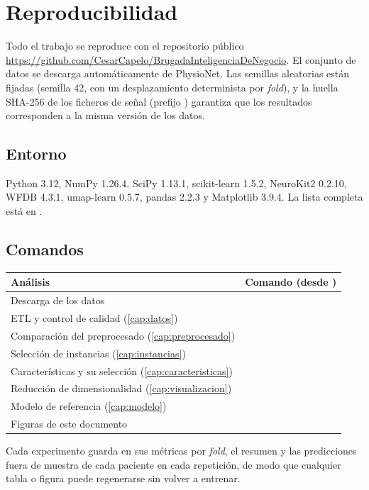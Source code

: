 \clearpage
\section{Reproducibilidad}\label{ap:reproducibilidad}

Todo el trabajo se reproduce con el repositorio público \url{https://github.com/CesarCapelo/BrugadaInteligenciaDeNegocio}. El conjunto de datos se descarga automáticamente de PhysioNet. Las semillas aleatorias están fijadas (semilla 42, con un desplazamiento determinista por \emph{fold}), y la huella SHA-256 de los ficheros de señal (prefijo ) garantiza que los resultados corresponden a la misma versión de los datos.

\subsection*{Entorno}

Python 3.12, NumPy 1.26.4, SciPy 1.13.1, scikit-learn 1.5.2, NeuroKit2 0.2.10, WFDB 4.3.1, umap-learn 0.5.7, pandas 2.2.3 y Matplotlib 3.9.4. La lista completa está en .

\subsection*{Comandos}

\begin{center}
\small
\begin{tabularx}{\linewidth}{@{}p{4.3cm}L@{}}
\toprule
\textbf{Análisis} & \textbf{Comando (desde )} \\
\midrule
Descarga de los datos &  \\
ETL y control de calidad (\cref{cap:datos}) &  \\
Comparación del preprocesado (\cref{cap:preprocesado}) &  \\
Selección de instancias (\cref{cap:instancias}) &  \\
Características y su selección (\cref{cap:caracteristicas}) &  \\
Reducción de dimensionalidad (\cref{cap:visualizacion}) &  \\
Modelo de referencia (\cref{cap:modelo}) &  \\
Figuras de este documento &  \\
\bottomrule
\end{tabularx}
\end{center}

Cada experimento guarda en  sus métricas por \emph{fold}, el resumen y las predicciones fuera de muestra de cada paciente en cada repetición, de modo que cualquier tabla o figura puede regenerarse sin volver a entrenar.
